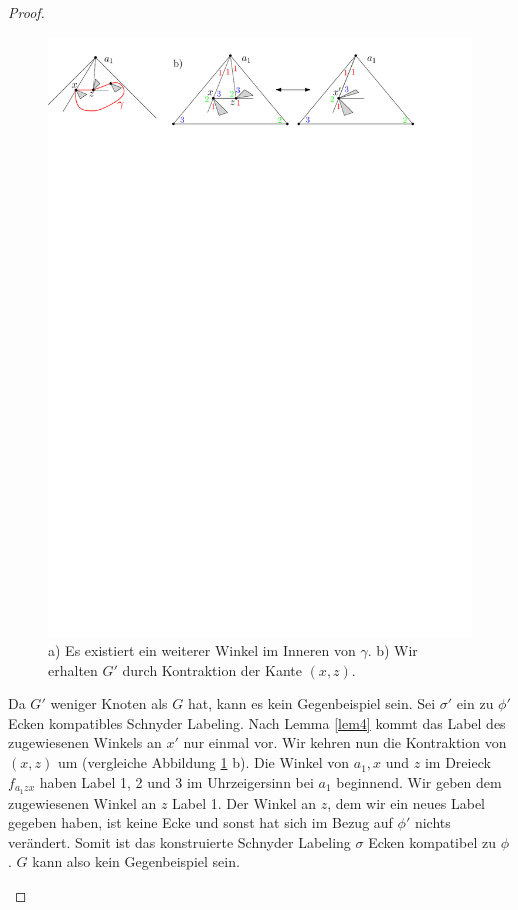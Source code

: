 \begin{proof}
\begin{description}[leftmargin =0pt, font = \rmfamily ,listparindent=\parindent,parsep=0pt]
\begin{figure}
\centering
\includegraphics[width=1\textwidth]{lem5_3.pdf}
\caption{a) Es existiert ein weiterer Winkel im Inneren von $\gamma$. b) Wir erhalten $G'$ durch Kontraktion der Kante $(x,z)$.}
\label{pic_lem5_3}
\end{figure}

Da $G'$ weniger Knoten als $G$ hat, kann es kein Gegenbeispiel sein. Sei $\sigma'$ ein zu $\phi'$ Ecken kompatibles Schnyder Labeling. Nach Lemma \ref{lem4} kommt das Label des zugewiesenen Winkels an $x'$ nur einmal vor. Wir kehren nun die Kontraktion von $(x,z)$ um (vergleiche Abbildung \ref{pic_lem5_3} b). Die Winkel von $a_1,x$ und $z$ im Dreieck $f_{a_1zx}$ haben Label 1, 2 und 3 im Uhrzeigersinn bei $a_1$ beginnend. Wir geben dem zugewiesenen Winkel an $z$ Label 1. Der Winkel an $z$, dem wir ein neues Label gegeben haben, ist keine Ecke und sonst hat sich im Bezug auf $\phi'$ nichts verändert. Somit ist das konstruierte Schnyder Labeling $\sigma$ Ecken kompatibel zu $\phi$. $G$ kann also kein Gegenbeispiel sein.


\end{description}
\end{proof}
